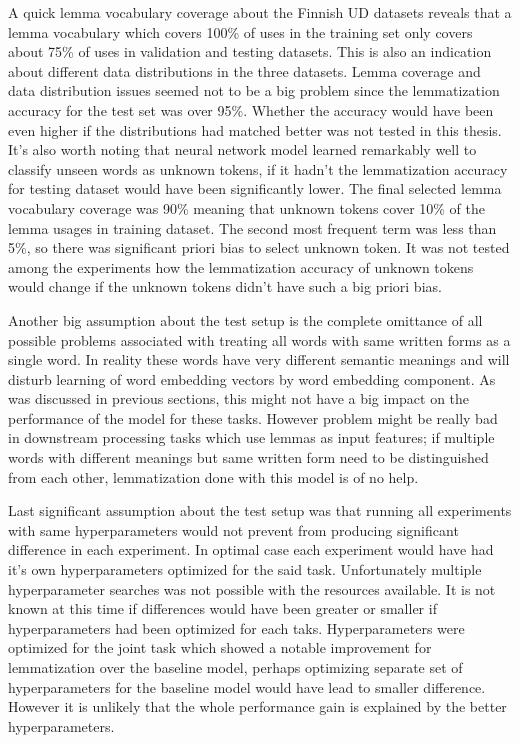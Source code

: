 \documentclass[12pt,a4paper,english
]{tutthesis}
\begin{document}
A quick lemma vocabulary coverage about the Finnish UD datasets reveals that a lemma vocabulary which covers 100\% of uses in the training set only covers about 75\% of uses in validation and testing datasets. This is also an indication about different data distributions in the three datasets. Lemma coverage and data distribution issues seemed not to be a big problem since the lemmatization accuracy for the test set was over 95\%. Whether the accuracy would have been even higher if the distributions had matched better was not tested in this thesis. It's also worth noting that neural network model learned remarkably well to classify unseen words as unknown tokens, if it hadn't the lemmatization accuracy for testing dataset would have been significantly lower. The final selected lemma vocabulary coverage was 90\% meaning that unknown tokens cover 10\% of the lemma usages in training dataset. The second most frequent term was less than 5\%, so there was significant priori bias to select unknown token. It was not tested among the experiments how the lemmatization accuracy of unknown tokens would change if the unknown tokens didn't have such a big priori bias.

Another big assumption about the test setup is the complete omittance of all possible problems associated with treating all words with same written forms as a single word. In reality these words have very different semantic meanings and will disturb learning of word embedding vectors by word embedding component. As was discussed in previous sections, this might not have a big impact on the performance of the model for these tasks. However problem might be really bad in downstream processing tasks which use lemmas as input features; if multiple words with different meanings but same written form need to be distinguished from each other, lemmatization done with this model is of no help.

Last significant assumption about the test setup was that running all experiments with same hyperparameters would not prevent from producing significant difference in each experiment. In optimal case each experiment would have had it's own hyperparameters optimized for the said task. Unfortunately multiple hyperparameter searches was not possible with the resources available. It is not known at this time if differences would have been greater or smaller if hyperparameters had been optimized for each taks. Hyperparameters were optimized for the joint task which showed a notable improvement for lemmatization over the baseline model, perhaps optimizing separate set of hyperparameters for the baseline model would have lead to smaller difference. However it is unlikely that the whole performance gain is explained by the better hyperparameters.
\end{document}
